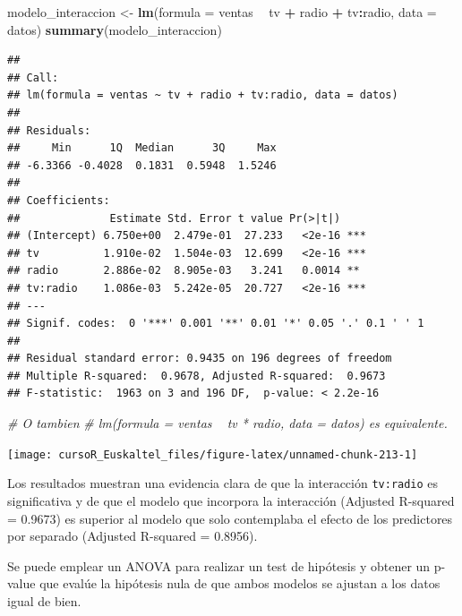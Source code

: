 \documentclass[]{book}
\newenvironment{Shaded}{\begin{snugshade}}{\end{snugshade}}
\newcommand{\KeywordTok}[1]{\textcolor[rgb]{0.13,0.29,0.53}{\textbf{#1}}}
\newcommand{\DataTypeTok}[1]{\textcolor[rgb]{0.13,0.29,0.53}{#1}}
\newcommand{\StringTok}[1]{\textcolor[rgb]{0.31,0.60,0.02}{#1}}
\newcommand{\CommentTok}[1]{\textcolor[rgb]{0.56,0.35,0.01}{\textit{#1}}}
\newcommand{\OperatorTok}[1]{\textcolor[rgb]{0.81,0.36,0.00}{\textbf{#1}}}
\newcommand{\NormalTok}[1]{#1}
\begin{document}
\begin{Shaded}
\begin{Highlighting}[]
\NormalTok{modelo_interaccion <-}\StringTok{ }\KeywordTok{lm}\NormalTok{(}\DataTypeTok{formula =}\NormalTok{ ventas }\OperatorTok{~}\StringTok{ }\NormalTok{tv }\OperatorTok{+}\StringTok{ }\NormalTok{radio }\OperatorTok{+}\StringTok{ }\NormalTok{tv}\OperatorTok{:}\NormalTok{radio, }\DataTypeTok{data =}\NormalTok{ datos)}
\KeywordTok{summary}\NormalTok{(modelo_interaccion)}
\end{Highlighting}
\end{Shaded}

\begin{verbatim}
## 
## Call:
## lm(formula = ventas ~ tv + radio + tv:radio, data = datos)
## 
## Residuals:
##     Min      1Q  Median      3Q     Max 
## -6.3366 -0.4028  0.1831  0.5948  1.5246 
## 
## Coefficients:
##              Estimate Std. Error t value Pr(>|t|)    
## (Intercept) 6.750e+00  2.479e-01  27.233   <2e-16 ***
## tv          1.910e-02  1.504e-03  12.699   <2e-16 ***
## radio       2.886e-02  8.905e-03   3.241   0.0014 ** 
## tv:radio    1.086e-03  5.242e-05  20.727   <2e-16 ***
## ---
## Signif. codes:  0 '***' 0.001 '**' 0.01 '*' 0.05 '.' 0.1 ' ' 1
## 
## Residual standard error: 0.9435 on 196 degrees of freedom
## Multiple R-squared:  0.9678, Adjusted R-squared:  0.9673 
## F-statistic:  1963 on 3 and 196 DF,  p-value: < 2.2e-16
\end{verbatim}

\begin{Shaded}
\begin{Highlighting}[]
\CommentTok{# O tambien}
\CommentTok{# lm(formula = ventas ~ tv * radio, data = datos) es equivalente.}
\end{Highlighting}
\end{Shaded}

\begin{center}\texttt{[image: cursoR\_Euskaltel\_files/figure-latex/unnamed-chunk-213-1]} \end{center}

Los resultados muestran una evidencia clara de que la interacción
\texttt{tv:radio} es significativa y de que el modelo que incorpora la
interacción (Adjusted R-squared = 0.9673) es superior al modelo que solo
contemplaba el efecto de los predictores por separado (Adjusted
R-squared = 0.8956).

Se puede emplear un ANOVA para realizar un test de hipótesis y obtener
un p-value que evalúe la hipótesis nula de que ambos modelos se ajustan
a los datos igual de bien.
\end{document}
